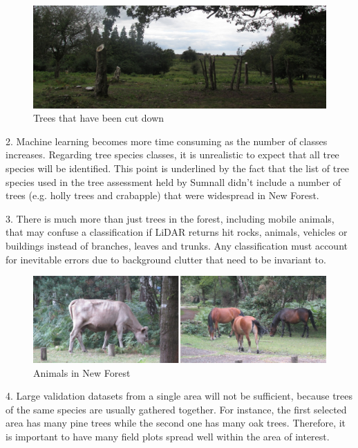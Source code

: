 \documentclass{subfiles}
\begin{document}
    \begin{figure} [!h]
    	\centering
    	\includegraphics[width=\textwidth]{img/NewForest/CC_TreesCutDown}
    	\caption{Trees that have been cut down}
    	\label{fig:CC_TreesCutDown}
    \end{figure}

    \par 2. Machine learning becomes more time consuming as the number of classes increases. Regarding tree species classes, it is unrealistic to expect that all tree species will be identified.  This point is underlined by the fact that the list of tree species used in the tree assessment held by Sumnall \cite{Sumnall2013} didn’t include a number of trees (e.g. holly trees and crabapple) that were widespread in New Forest. 
    
    \par 3.	There is much more than just trees in the forest, including mobile animals, that may confuse a classification if LiDAR returns hit rocks, animals, vehicles or buildings instead of branches, leaves and trunks. {\color{blue} Any classification must account for inevitable errors due to background clutter that need to be invariant to. }
        \begin{figure} [!h]
        	\centering
        	\includegraphics[width=\textwidth]{img/NewForest/CC_Animals}
        	\caption{Animals in New Forest}
        	\label{fig:CC_Animals}
        \end{figure}
    
    \par 4.	Large validation datasets from a single area will not be sufficient, because trees of the same species are usually gathered together. For instance, the first selected area has many pine trees while the second one has many oak trees. Therefore, it is important to have many field plots spread well within the area of interest.  
    
\end{document}
